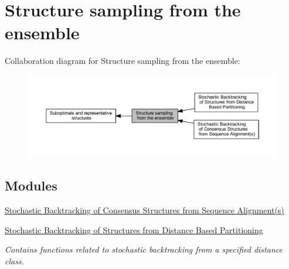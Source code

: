 \hypertarget{group__subopt__stochbt}{}\section{Structure sampling from the ensemble}
\label{group__subopt__stochbt}
Collaboration diagram for Structure sampling from the ensemble\+:
\nopagebreak
\begin{figure}[H]
\begin{center}
\leavevmode
\includegraphics[width=350pt]{group__subopt__stochbt}
\end{center}
\end{figure}
\subsection*{Modules}
\begin{DoxyCompactItemize}
\item 
\hyperlink{group__consensus__stochbt}{Stochastic Backtracking of Consensus Structures from Sequence Alignment(s)}
\item 
\hyperlink{group__kl__neighborhood__stochbt}{Stochastic Backtracking of Structures from Distance Based Partitioning}
\begin{DoxyCompactList}\small\item\em Contains functions related to stochastic backtracking from a specified distance class. \end{DoxyCompactList}\end{DoxyCompactItemize}
